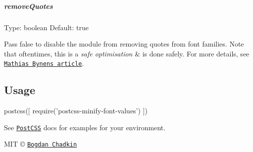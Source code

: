 \subparagraph*{remove\+Quotes}

Type\+: {\ttfamily boolean} Default\+: {\ttfamily true}

Pass {\ttfamily false} to disable the module from removing quotes from font families. Note that oftentimes, this is a {\itshape safe optimisation} \& is done safely. For more details, see \href{https://mathiasbynens.be/notes/unquoted-font-family}{\tt Mathias Bynens\textquotesingle{} article}.

\subsection*{Usage}


\begin{DoxyCode}
postcss([ require('postcss-minify-font-values') ])
\end{DoxyCode}


See \href{https://github.com/postcss/postcss}{\tt Post\+C\+SS} docs for examples for your environment.

M\+IT © \href{mailto:trysound@yandex.ru}{\tt Bogdan Chadkin} 